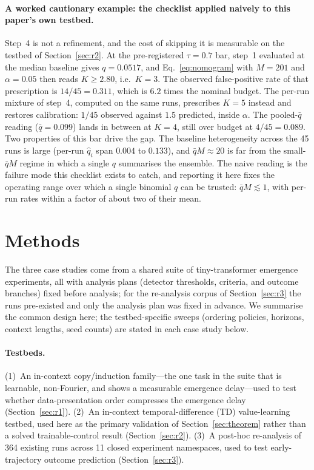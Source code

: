 \documentclass[11pt]{article}
\theoremstyle{plain}
\theoremstyle{definition}
\begin{document}
\paragraph{A worked cautionary example: the checklist applied naively to this paper's own
testbed.}\label{par:box1caution}
Step~4 is not a refinement, and the cost of skipping it is measurable on the testbed of
Section~\ref{sec:r2}. At the pre-registered $\tau=0.7$ bar, step~1 evaluated at the median
baseline gives $q=0.0517$, and Eq.~\eqref{eq:nomogram} with $M=201$ and $\alpha=0.05$ then
reads $K\geq2.80$, i.e.\ $K=3$. The observed false-positive rate of that prescription is
$14/45=0.311$, which is $6.2$ times the nominal budget. The per-run mixture of step~4,
computed on the same runs, prescribes $K=5$ instead and restores calibration: $1/45$
observed against $1.5$ predicted, inside $\alpha$. The pooled-$\bar q$ reading
($\bar q=0.099$) lands in between at $K=4$, still over budget at $4/45=0.089$. Two
properties of this bar drive the gap. The baseline heterogeneity across the 45 runs is
large (per-run $\hat q_i$ span $0.004$ to $0.133$), and $\bar qM\approx20$ is far from the
small-$\bar qM$ regime in which a single $q$ summarises the ensemble. The naive reading is
the failure mode this checklist exists to catch, and reporting it here fixes the operating
range over which a single binomial $q$ can be trusted: $\bar qM\lesssim1$, with per-run
rates within a factor of about two of their mean.

\section{Methods}\label{sec:methods}

The three case studies come from a shared suite of tiny-transformer emergence experiments,
all with analysis plans (detector thresholds, criteria, and outcome branches) fixed before
analysis; for the re-analysis corpus of Section~\ref{sec:r3} the runs pre-existed and only
the analysis plan was fixed in advance. We summarise the common design here; the
testbed-specific sweeps (ordering policies, horizons, context lengths, seed counts) are
stated in each case study below.

\paragraph{Testbeds.} (1)~An in-context copy/induction family---the one task in the suite
that is learnable, non-Fourier, and shows a measurable emergence delay---used to test whether
data-presentation order compresses the emergence delay (Section~\ref{sec:r1}). (2)~An
in-context temporal-difference (TD) value-learning testbed, used here as the primary
validation of Section~\ref{sec:theorem} rather than a solved trainable-control result
(Section~\ref{sec:r2}). (3)~A post-hoc re-analysis of 364 existing runs across 11 closed
experiment namespaces, used to test early-trajectory outcome prediction
(Section~\ref{sec:r3}).
\end{document}
